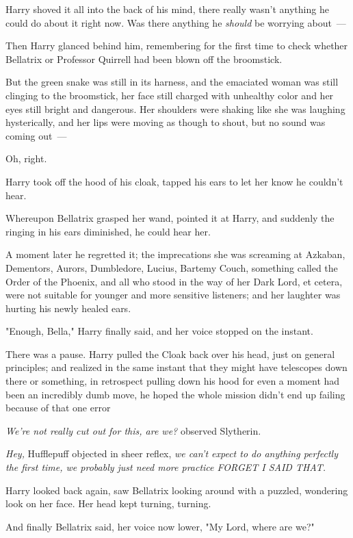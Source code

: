Harry shoved it all into the back of his mind, there really wasn't anything he
could do about it right now. Was there anything he \emph{should} be worrying
about~---

Then Harry glanced behind him, remembering for the first time to check whether
Bellatrix or Professor Quirrell had been blown off the broomstick.

But the green snake was still in its harness, and the emaciated woman was still
clinging to the broomstick, her face still charged with unhealthy color and her
eyes still bright and dangerous. Her shoulders were shaking like she was
laughing hysterically, and her lips were moving as though to shout, but no
sound was coming out~---

Oh, right.

Harry took off the hood of his cloak, tapped his ears to let her know he
couldn't hear.

Whereupon Bellatrix grasped her wand, pointed it at Harry, and suddenly the
ringing in his ears diminished, he could hear her.

A moment later he regretted it; the imprecations she was screaming at Azkaban,
Dementors, Aurors, Dumbledore, Lucius, Bartemy Couch, something called the
Order of the Phoenix, and all who stood in the way of her Dark Lord, et cetera,
were not suitable for younger and more sensitive listeners; and her laughter
was hurting his newly healed ears.

"Enough, Bella," Harry finally said, and her voice stopped on the instant.

There was a pause. Harry pulled the Cloak back over his head, just on general
principles; and realized in the same instant that they might have telescopes
down there or something, in retrospect pulling down his hood for even a moment
had been an incredibly dumb move, he hoped the whole mission didn't end up
failing because of that one error{\el}

\emph{We're not really cut out for this, are we?} observed Slytherin.

\emph{Hey,} Hufflepuff objected in sheer reflex, \emph{we can't expect to do
anything perfectly the first time, we probably just need more practice FORGET I
SAID THAT.}

Harry looked back again, saw Bellatrix looking around with a puzzled, wondering
look on her face. Her head kept turning, turning.

And finally Bellatrix said, her voice now lower, "My Lord, where are we?"

